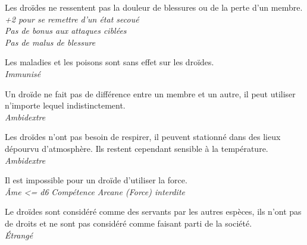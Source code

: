 \begin{description}[align=left]
\item [Créature artificielle] 	%
		Les droïdes ne ressentent pas la douleur de blessures ou de la perte d’un membre.\\
		\emph{+2 pour se remettre d’un état secoué}\\
		\emph{Pas de bonus aux attaques ciblées}\\
		\emph{Pas de malus de blessure}

\item [Immunisé] 				%
		Les maladies et les poisons sont sans effet sur les droïdes.\\
		\emph{Immunisé}

\item [Ambidextre] 				%
		Un droïde ne fait pas de différence entre un membre et un autre, il peut utiliser n’importe lequel indistinctement.\\
		\emph{Ambidextre}

\item [Manque pas d’air] 		%
		Les droïdes n’ont pas besoin de respirer, il peuvent stationné dans des lieux dépourvu d’atmosphère. Ils restent cependant sensible à la température.\\
		\emph{Ambidextre}

\item [Pas d’\^Ame] 			%
		Il est impossible pour un droïde d’utiliser la force.\\
		\emph{\^Ame <= d6}
		\emph{Compétence Arcane (Force) interdite}

\item [Outsider] 				%
		Le droïdes sont considéré comme des servants par les autres espèces, ils n’ont pas de droits et ne sont pas considéré comme faisant parti de la société.\\
		\emph{\'Etrangé}
\end{description}